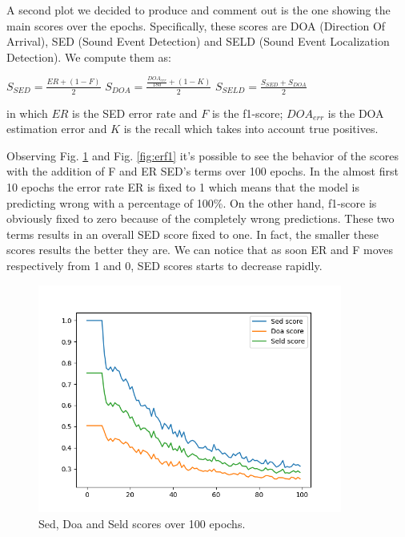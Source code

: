 \documentclass[11pt]{article}
\begin{document}
\noindent
A second plot we decided to produce and comment out is the one showing the main scores over the epochs. Specifically, these scores are DOA (Direction Of Arrival), SED (Sound Event Detection) and SELD (Sound Event Localization Detection). We compute them as:

$S_{SED} = \frac{ER + (1-F)}{2}$ \space\space
$S_{DOA} = \frac{\frac{DOA_{err}}{180} + (1-K)}{2}$ \space\space
$S_{SELD} = \frac{S_{SED} + S_{DOA}}{2}$ \space\space

\noindent
in which $ER$ is the SED error rate and $F$ is the f1-score; $DOA_{err}$ is the DOA estimation error and $K$ is the recall which takes into account true positives.

Observing Fig. \ref{fig:scores} and Fig. \ref{fig:erf1} it's possible to see the behavior of the scores with the addition of F and ER SED's terms over 100 epochs. In the almost first 10 epochs the error rate ER is fixed to 1 which means that the model is predicting wrong with a percentage of 100\%. On the other hand, f1-score is obviously fixed to zero because of the completely wrong predictions. These two terms results in an overall SED score fixed to one. In fact, the smaller these scores results the better they are. We can notice that as soon ER and F moves respectively from 1 and 0, SED scores starts to decrease rapidly.

\begin{figure}[h!]
	\centering
	\includegraphics[width=10cm]{img/scores.png}
	\caption{Sed, Doa and Seld scores over 100 epochs.}
	\label{fig:scores}
\end{figure}
\end{document}
